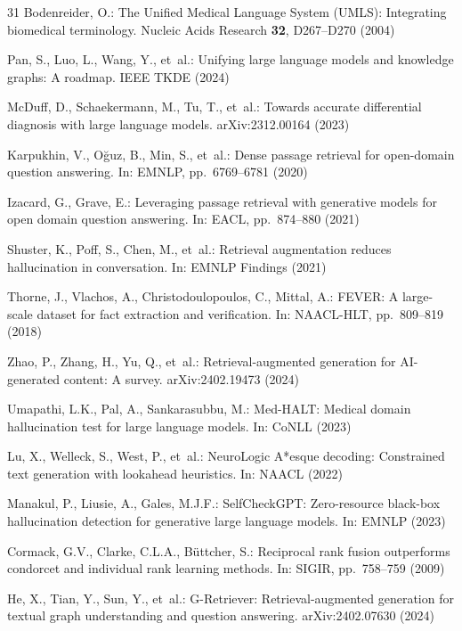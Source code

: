 \documentclass[runningheads]{llncs}
\begin{document}
\begin{thebibliography}{31}
Bodenreider, O.: The Unified Medical Language System (UMLS): Integrating biomedical terminology. Nucleic Acids Research \textbf{32}, D267--D270 (2004)

Pan, S., Luo, L., Wang, Y., et~al.: Unifying large language models and knowledge graphs: A roadmap. IEEE TKDE (2024)

McDuff, D., Schaekermann, M., Tu, T., et~al.: Towards accurate differential diagnosis with large language models. arXiv:2312.00164 (2023)

Karpukhin, V., O\u{g}uz, B., Min, S., et~al.: Dense passage retrieval for open-domain question answering. In: EMNLP, pp.~6769--6781 (2020)

Izacard, G., Grave, E.: Leveraging passage retrieval with generative models for open domain question answering. In: EACL, pp.~874--880 (2021)

Shuster, K., Poff, S., Chen, M., et~al.: Retrieval augmentation reduces hallucination in conversation. In: EMNLP Findings (2021)

Thorne, J., Vlachos, A., Christodoulopoulos, C., Mittal, A.: FEVER: A large-scale dataset for fact extraction and verification. In: NAACL-HLT, pp.~809--819 (2018)

Zhao, P., Zhang, H., Yu, Q., et~al.: Retrieval-augmented generation for AI-generated content: A survey. arXiv:2402.19473 (2024)

Umapathi, L.K., Pal, A., Sankarasubbu, M.: Med-HALT: Medical domain hallucination test for large language models. In: CoNLL (2023)

Lu, X., Welleck, S., West, P., et~al.: NeuroLogic A*esque decoding: Constrained text generation with lookahead heuristics. In: NAACL (2022)

Manakul, P., Liusie, A., Gales, M.J.F.: SelfCheckGPT: Zero-resource black-box hallucination detection for generative large language models. In: EMNLP (2023)

Cormack, G.V., Clarke, C.L.A., B\"uttcher, S.: Reciprocal rank fusion outperforms condorcet and individual rank learning methods. In: SIGIR, pp.~758--759 (2009)

He, X., Tian, Y., Sun, Y., et~al.: G-Retriever: Retrieval-augmented generation for textual graph understanding and question answering. arXiv:2402.07630 (2024)


\end{thebibliography}
\end{document}
